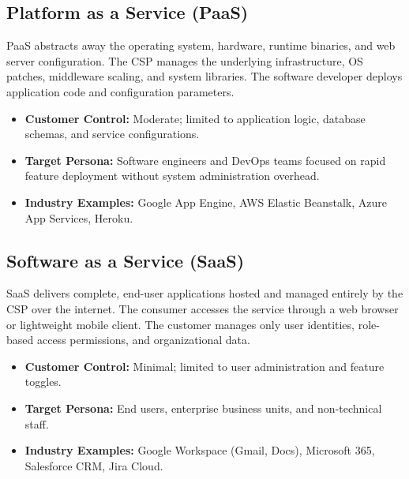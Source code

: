 \subsection{Platform as a Service (PaaS)}
PaaS abstracts away the operating system, hardware, runtime binaries, and web server configuration. The CSP manages the underlying infrastructure, OS patches, middleware scaling, and system libraries. The software developer deploys application code and configuration parameters.
\begin{itemize}
    \item \textbf{Customer Control:} Moderate; limited to application logic, database schemas, and service configurations.
    \item \textbf{Target Persona:} Software engineers and DevOps teams focused on rapid feature deployment without system administration overhead.
    \item \textbf{Industry Examples:} Google App Engine, AWS Elastic Beanstalk, Azure App Services, Heroku.
\end{itemize}

\subsection{Software as a Service (SaaS)}
SaaS delivers complete, end-user applications hosted and managed entirely by the CSP over the internet. The consumer accesses the service through a web browser or lightweight mobile client. The customer manages only user identities, role-based access permissions, and organizational data.
\begin{itemize}
    \item \textbf{Customer Control:} Minimal; limited to user administration and feature toggles.
    \item \textbf{Target Persona:} End users, enterprise business units, and non-technical staff.
    \item \textbf{Industry Examples:} Google Workspace (Gmail, Docs), Microsoft 365, Salesforce CRM, Jira Cloud.
\end{itemize}

